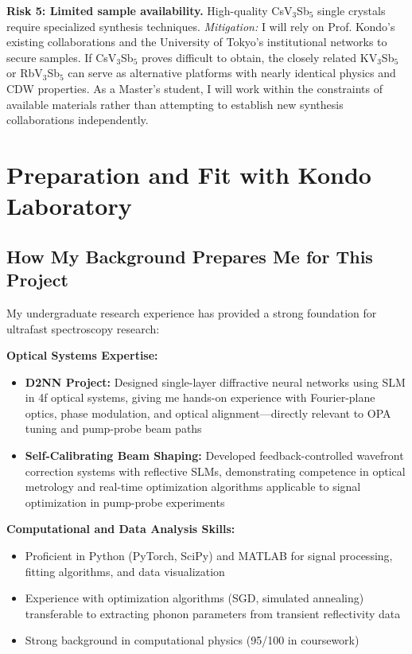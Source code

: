 \documentclass[12pt,a4paper]{article}
\begin{document}
\textbf{Risk 5: Limited sample availability.} High-quality CsV$_3$Sb$_5$ single crystals require specialized synthesis techniques. \textit{Mitigation:} I will rely on Prof. Kondo's existing collaborations and the University of Tokyo's institutional networks to secure samples. If CsV$_3$Sb$_5$ proves difficult to obtain, the closely related KV$_3$Sb$_5$ or RbV$_3$Sb$_5$ can serve as alternative platforms with nearly identical physics and CDW properties. As a Master's student, I will work within the constraints of available materials rather than attempting to establish new synthesis collaborations independently.

\section{Preparation and Fit with Kondo Laboratory}

\subsection{How My Background Prepares Me for This Project}

My undergraduate research experience has provided a strong foundation for ultrafast spectroscopy research:

\textbf{Optical Systems Expertise:}
\begin{itemize}
    \item \textbf{D2NN Project:} Designed single-layer diffractive neural networks using SLM in 4f optical systems, giving me hands-on experience with Fourier-plane optics, phase modulation, and optical alignment—directly relevant to OPA tuning and pump-probe beam paths
    \item \textbf{Self-Calibrating Beam Shaping:} Developed feedback-controlled wavefront correction systems with reflective SLMs, demonstrating competence in optical metrology and real-time optimization algorithms applicable to signal optimization in pump-probe experiments
\end{itemize}

\textbf{Computational and Data Analysis Skills:}
\begin{itemize}
    \item Proficient in Python (PyTorch, SciPy) and MATLAB for signal processing, fitting algorithms, and data visualization
    \item Experience with optimization algorithms (SGD, simulated annealing) transferable to extracting phonon parameters from transient reflectivity data
    \item Strong background in computational physics (95/100 in coursework)
\end{itemize}
\end{document}
